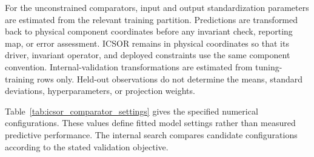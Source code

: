 For the unconstrained comparators, input and output standardization parameters are estimated from the relevant training partition. Predictions are transformed back to physical component coordinates before any invariant check, reporting map, or error assessment. ICSOR remains in physical coordinates so that its driver, invariant operator, and deployed constraints use the same component convention. Internal-validation transformations are estimated from tuning-training rows only. Held-out observations do not determine the means, standard deviations, hyperparameters, or projection weights.

Table~\ref{tab:icsor_comparator_settings} gives the specified numerical configurations. These values define fitted model settings rather than measured predictive performance. The internal search compares candidate configurations according to the stated validation objective.

